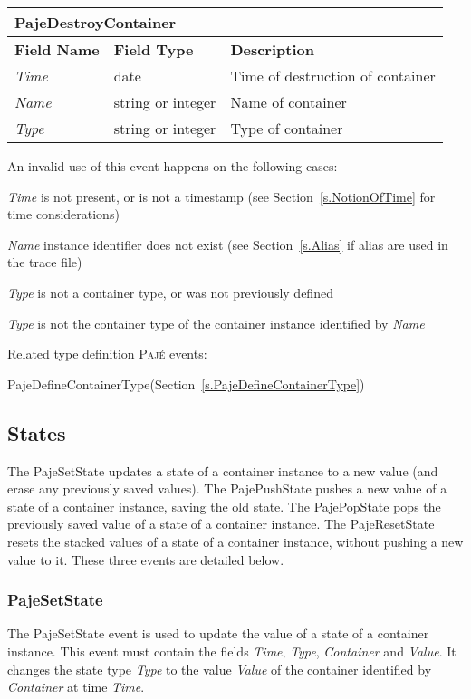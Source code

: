 \documentclass[12pt]{article}
\newcommand{\Paje}{\textsc{Paj\'e}\xspace}
\newcommand{\PajeField}[1]{\emph{#1}\xspace}
\newcommand{\Time}{\PajeField{Time}}
\newcommand{\Name}{\PajeField{Name}}
\newcommand{\Type}{\PajeField{Type}}
\newcommand{\Container}{\PajeField{Container}}
\newcommand{\Value}{\PajeField{Value}}
\newcommand{\PajeEvent}[1]{\textsf{#1}\xspace}
\newcommand{\PajeDefineContainerType}{\PajeEvent{PajeDefineContainerType}}
\newcommand{\PajeDestroyContainer}{\PajeEvent{PajeDestroyContainer}}
\newcommand{\PajeSetState}{\PajeEvent{PajeSetState}}
\newcommand{\PajePushState}{\PajeEvent{PajePushState}}
\newcommand{\PajePopState}{\PajeEvent{PajePopState}}
\newcommand{\PajeResetState}{\PajeEvent{PajeResetState}}
\newenvironment{itemize*}%
               {\vspace{-1em}
                 \begin{itemize}%
                   \setlength{\itemsep}{0pt}%
                   \setlength{\parskip}{0pt}}%
               {\end{itemize}}
\begin{document}
\begin{tabular}{|LLL|}
\hline
\multicolumn{3}{|T|}{\textbf{\PajeDestroyContainer}}\\\hline
\textbf{Field Name} & \textbf{Field Type} & \textbf{Description}\\
\hline
\Time          & date              & Time of destruction of container \\
\Name          & string or integer & Name of container \\
\Type          & string or integer & Type of container \\
\hline
\end{tabular}

An invalid use of this event happens on the following cases:
\begin{itemize*}
\item \Time is not present, or is not a timestamp (see Section~\ref{s.NotionOfTime} for time considerations)
\item \Name instance identifier does not exist (see Section~\ref{s.Alias} if alias are used in the trace file)
\item \Type is not a container type, or was not previously defined
\item \Type is not the container type of the container instance identified by \Name
\end{itemize*}

Related type definition \Paje events:
\begin{itemize*}
\item \PajeDefineContainerType (Section~\ref{s.PajeDefineContainerType})
\end{itemize*}

\subsection{States}
The \PajeSetState updates a state of a container instance to a new
value (and erase any previously saved values). The \PajePushState
pushes a new value of a state of a container instance, saving the old
state. The \PajePopState pops the previously saved value of a state of
a container instance. The \PajeResetState resets the stacked values of a 
state of a container instance, without pushing a new value to it.
These three events are detailed below.

\subsubsection{PajeSetState}
\label{s.PajeSetState}
The \PajeSetState event is used to update the value of a state of a
container instance. This event must contain the fields \Time, \Type,
\Container and \Value. It changes the state type \Type to the value
\Value of the container identified by \Container at time \Time.
\end{document}
